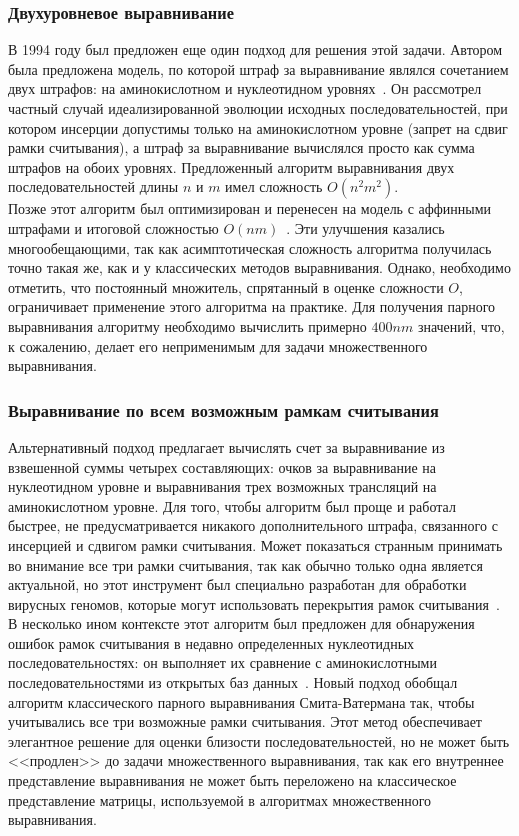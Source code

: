 \subsubsection[Двухуровневое выравнивание]{\large Двухуровневое выравнивание}
\hspace{\parindent} В 1994 году был предложен еще один подход для решения этой задачи. Автором была предложена модель, по которой штраф за выравнивание являлся сочетанием двух штрафов: на аминокислотном и нуклеотидном уровнях~\cite{Hein}. Он рассмотрел частный случай идеализированной эволюции исходных последовательностей, при котором инсерции допустимы только на аминокислотном уровне (запрет на сдвиг рамки считывания), а штраф за выравнивание вычислялся просто как сумма штрафов на обоих уровнях. Предложенный алгоритм выравнивания двух последовательностей длины $n$ и $m$ имел сложность $O(n^2m^2)$.\\
\indent Позже этот алгоритм был оптимизирован и перенесен на модель с аффинными штрафами и итоговой сложностью $O(nm)$~\cite{HeinOptimize}. Эти улучшения казались многообещающими, так как асимптотическая сложность алгоритма получилась точно такая же, как и у классических методов выравнивания. Однако, необходимо отметить, что постоянный множитель, спрятанный в оценке сложности $O$, ограничивает применение этого алгоритма на практике. Для получения парного выравнивания алгоритму необходимо вычислить примерно $400nm$ значений, что, к сожалению, делает его неприменимым для задачи множественного выравнивания.

\subsubsection[Выравнивание по всем возможным рамкам считывания]{\large Выравнивание по всем возможным рамкам считывания}
\hspace{\parindent} Альтернативный подход предлагает вычислять счет за выравнивание из взвешенной суммы четырех составляющих: очков за выравнивание на нуклеотидном уровне и выравнивания трех возможных трансляций на аминокислотном уровне. Для того, чтобы алгоритм был проще и работал быстрее, не предусматривается никакого дополнительного штрафа, связанного с инсерцией и сдвигом рамки считывания. Может показаться странным принимать во внимание все три рамки считывания, так как обычно только одна является актуальной, но этот инструмент был специально разработан для обработки вирусных геномов, которые могут использовать перекрытия рамок считывания~\cite{VirusAlign}.\\
\indent В несколько ином контексте этот алгоритм был предложен для обнаружения ошибок рамок считывания в недавно определенных нуклеотидных последовательностях: он выполняет их сравнение с аминокислотными последовательностями из открытых баз данных~\cite{FrameshiftError}. Новый подход обобщал алгоритм классического парного выравнивания Смита-Ватермана так, чтобы учитывались все три возможные рамки считывания. Этот метод обеспечивает элегантное решение для оценки близости последовательностей, но не может быть <<продлен>> до задачи множественного выравнивания, так как его внутреннее представление выравнивания не может быть переложено на классическое представление матрицы, используемой в алгоритмах множественного выравнивания.

